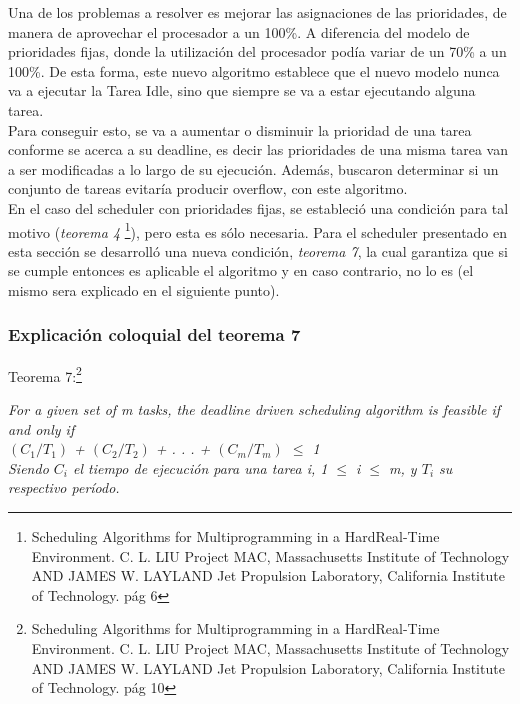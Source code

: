 \documentclass[a4paper]{article}
\begin{document}
Una de los problemas a resolver es mejorar las asignaciones de las prioridades, de manera de aprovechar el procesador a un 100\%. A diferencia del modelo de prioridades fijas, donde la utilización del procesador podía variar de un 70\% a un 100\%. De esta forma, este nuevo algoritmo establece que el nuevo modelo nunca va a ejecutar la Tarea Idle, sino que siempre se va a estar ejecutando alguna tarea. \\

 Para conseguir esto, se va a aumentar o disminuir la prioridad de una tarea conforme se acerca a su deadline, es decir las prioridades de una misma tarea van a ser modificadas a lo largo de su ejecución. Además, buscaron determinar si un conjunto de tareas evitar\'ia producir overflow, con este algoritmo.\\
 
  En el caso del scheduler con prioridades fijas, se estableció una condición para tal motivo (\textit{teorema 4} \footnote{Scheduling Algorithms for Multiprogramming in a HardReal-Time Environment.
C. L. LIU Project MAC, Massachusetts Institute of Technology AND JAMES W. LAYLAND Jet Propulsion Laboratory, California Institute of Technology. pág 6}), pero esta es s\'olo necesaria. Para el scheduler presentado en esta sección se desarroll\'o una nueva condición, \textit{teorema 7}, la cual garantiza que si se cumple entonces es aplicable el algoritmo y en caso contrario, no lo es (el mismo sera explicado en el siguiente punto). \\
  
 \newpage
\subsubsection{Explicaci\'on coloquial del teorema 7}

Teorema 7:\footnote{Scheduling Algorithms for Multiprogramming in a HardReal-Time Environment.
C. L. LIU Project MAC, Massachusetts Institute of Technology AND JAMES W. LAYLAND Jet Propulsion Laboratory, California Institute of Technology. pág 10}

\textit {For a given set of m tasks, the deadline driven scheduling algorithm
is feasible if and only if }\\
 
 \textit {$(C_1/T_1)$ + $(C_2/T_2)$ + . . . + $(C_m/T_m)$ $\leq$ 1 } \\

\textit{Siendo $C_i$ el tiempo de ejecuci\'on para una tarea i, 1 $\leq$ i $\leq$ m, y $T_i$ su respectivo per\'iodo.}\\
\end{document}
